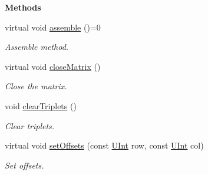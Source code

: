 \begin{Indent}{\bf Methods}\par
\begin{DoxyCompactItemize}
\item 
virtual void \hyperlink{classFVCode3D_1_1MatrixHandler_a46891c99311b8657e14484a6f1f6b8ce}{assemble} ()=0
\begin{DoxyCompactList}\small\item\em Assemble method. \end{DoxyCompactList}\item 
virtual void \hyperlink{classFVCode3D_1_1MatrixHandler_ac18ada27beb5b7b4e9b0b2a8d7c72671}{close\+Matrix} ()
\begin{DoxyCompactList}\small\item\em Close the matrix. \end{DoxyCompactList}\item 
void \hyperlink{classFVCode3D_1_1MatrixHandler_abb040341a6410657044ef016d1f0b1d4}{clear\+Triplets} ()
\begin{DoxyCompactList}\small\item\em Clear triplets. \end{DoxyCompactList}\item 
virtual void \hyperlink{classFVCode3D_1_1MatrixHandler_aa0943b024c7af8f53b95addb42b75e96}{set\+Offsets} (const \hyperlink{namespaceFVCode3D_a4bf7e328c75d0fd504050d040ebe9eda}{U\+Int} row, const \hyperlink{namespaceFVCode3D_a4bf7e328c75d0fd504050d040ebe9eda}{U\+Int} col)
\begin{DoxyCompactList}\small\item\em Set offsets. \end{DoxyCompactList}\end{DoxyCompactItemize}
\end{Indent}
